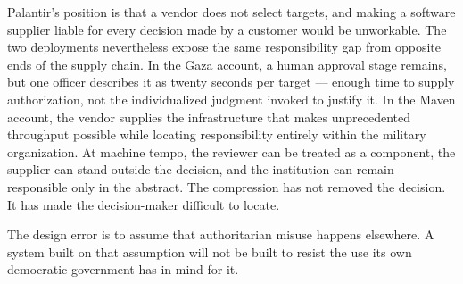 Palantir's position is that a vendor does not select
targets, and making a software supplier liable for every decision made
by a customer would be unworkable. The two deployments nevertheless
expose the same responsibility gap from opposite ends of the supply
chain. In the Gaza account, a human approval stage remains, but one
officer describes it as twenty seconds per target — enough time to
supply authorization, not the individualized judgment invoked to
justify it. In the Maven account, the vendor supplies the infrastructure
that makes unprecedented throughput possible while locating
responsibility entirely within the military organization. At machine
tempo, the reviewer can be treated as a component, the supplier can
stand outside the decision, and the institution can remain responsible
only in the abstract. The compression has not removed the decision. It
has made the decision-maker difficult to locate.

The design error is to assume that authoritarian misuse happens elsewhere. A system built on that assumption will not be built to resist the use its own democratic government has in mind for it.

